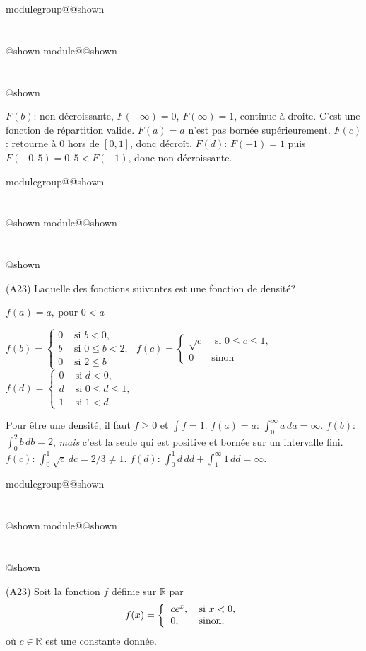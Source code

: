 \documentclass{Evaluation}
\makeatletter
\newcommand{\currentmodulekey}{}
\newcommand{\currentmoduletitle}{}
\newcommand{\currentgroupkey}{}
\newcommand{\currentgrouptitle}{}
\newcommand{\showmoduleifneeded}{%
  \ifx\currentgroupkey\empty\else
    \expandafter\ifx\csname modulegroup@\currentgroupkey @shown\endcsname\relax
      \section*{\currentgrouptitle}%
      \expandafter\gdef\csname modulegroup@\currentgroupkey @shown\endcsname{1}%
    \fi
  \fi
  \expandafter\ifx\csname module@\currentmodulekey @shown\endcsname\relax
    \section*{\currentmoduletitle}%
    \expandafter\gdef\csname module@\currentmodulekey @shown\endcsname{1}%
  \fi
}
\newenvironment{H23}{\showmoduleifneeded}{}
\newenvironment{A23}{\showmoduleifneeded}{}
\makeatother
\begin{document}
\begin{questions}
\begin{H23}
\begin{solution}
    $F(b)$: non décroissante, $F(-\infty)=0$, $F(\infty)=1$, continue à droite. C'est une fonction de répartition valide. $F(a)=a$ n'est pas bornée supérieurement. $F(c)$: retourne à 0 hors de $[0,1]$, donc décroît. $F(d)$: $F(-1)=1$ puis $F(-0,5)=0,5<F(-1)$, donc non décroissante.
\end{solution}
\end{H23}

\begin{A23}
\question (A23) Laquelle des fonctions suivantes est une fonction de densité? 

\begin{checkboxes}
\choice $f(a)=a,\ \mbox{pour } 0 <a$
		
\correctchoice $ f(b) = \left\{
			\begin{array}{ll}
			0  & \mbox{ si } b<0, \\
			b & \mbox{ si } 0\leq b < 2,\\
			0 & \mbox{ si } 2 \leq b
			\end{array}
			\right. $
\choice $ f(c) = \left\{
			\begin{array}{ll}
			\sqrt{c}  & \mbox{ si } 0\leq c\leq 1, \\
			0 & \mbox{sinon}
			\end{array}
			\right. $
\choice $ f(d) = \left\{
			\begin{array}{ll}
			0  & \mbox{ si } d < 0, \\
			d & \mbox{ si } 0 \leq d \leq 1,\\
			1 &  \mbox{ si } 1 < d
			\end{array}
			\right. $
\end{checkboxes}

\begin{solution}
    Pour être une densité, il faut $f\geq 0$ et $\int f=1$. $f(a)=a$: $\int_0^\infty a\,da=\infty$. $f(b)$: $\int_0^2 b\,db=2$, \emph{mais} c'est la seule qui est positive et bornée sur un intervalle fini. $f(c)$: $\int_0^1\sqrt{c}\,dc=2/3\neq 1$. $f(d)$: $\int_0^1 d\,dd+\int_1^\infty 1\,dd=\infty$.
\end{solution}
\end{A23}

\begin{A23}
\question (A23)
Soit la fonction $f$ définie sur $\mathbb{R}$ par 
\begin{align*}
f(x)= \left\{
\begin{tabular}{l l}
$c e^{x}$,&\mbox{si $x<0$},\\
$0$,& \mbox{sinon},
\end{tabular}
\right.
\end{align*}
où $c\in\mathbb{R}$ est une constante donnée. 


\end{A23}
\end{questions}
\end{document}
